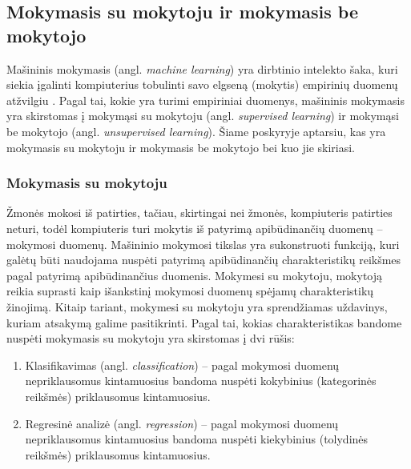 \subsection{Mokymasis su mokytoju ir mokymasis be mokytojo}

Mašininis mokymasis (angl. \textit{machine learning}) yra dirbtinio intelekto šaka, kuri siekia įgalinti kompiuterius tobulinti savo elgseną (mokytis) empirinių duomenų atžvilgiu \cite{duda2001pattern}. Pagal tai, kokie yra turimi empiriniai duomenys, mašininis mokymasis yra skirstomas į mokymąsi su mokytoju (angl. \textit{supervised learning}) ir mokymąsi be mokytojo (angl. \textit{unsupervised learning}). Šiame poskyryje aptarsiu, kas yra mokymasis su mokytoju ir mokymasis be mokytojo bei kuo jie skiriasi.

\subsubsection{Mokymasis su mokytoju}

Žmonės mokosi iš patirties, tačiau, skirtingai nei žmonės, kompiuteris patirties neturi, todėl kompiuteris turi mokytis iš patyrimą apibūdinančių duomenų -- mokymosi duomenų. Mašininio mokymosi tikslas yra sukonstruoti funkciją, kuri galėtų būti naudojama nuspėti patyrimą apibūdinančių charakteristikų reikšmes pagal patyrimą apibūdinančius duomenis. Mokymesi su mokytoju, mokytoją reikia suprasti kaip išankstinį mokymosi duomenų spėjamų charakteristikų žinojimą. Kitaip tariant, mokymesi su mokytoju yra sprendžiamas uždavinys, kuriam atsakymą galime pasitikrinti. Pagal tai, kokias charakteristikas bandome nuspėti mokymasis su mokytoju yra skirstomas į dvi rūšis:
\begin{enumerate}
  \item Klasifikavimas (angl. \textit{classification}) -- pagal mokymosi duomenų nepriklausomus kintamuosius bandoma nuspėti kokybinius (kategorinės reikšmės) priklausomus kintamuosius.
  \item Regresinė analizė (angl. \textit{regression}) -- pagal mokymosi duomenų nepriklausomus kintamuosius bandoma nuspėti kiekybinius (tolydinės reikšmės) priklausomus kintamuosius.
\end{enumerate} 


